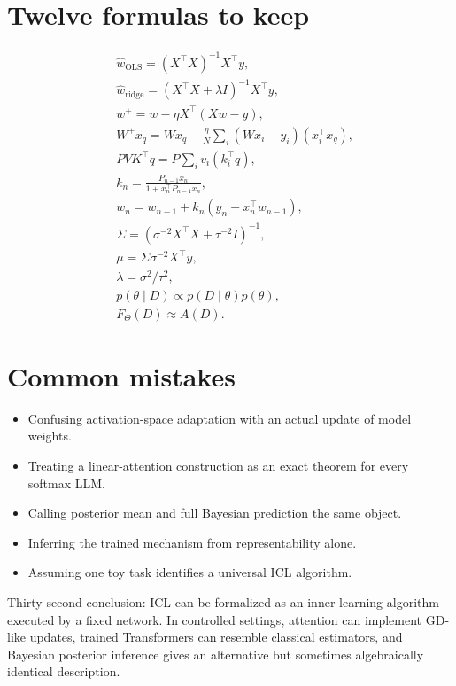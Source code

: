 \documentclass[11pt,a4paper,oneside,openany]{memoir}
\theoremstyle{definition}
\begin{document}
\section{Twelve formulas to keep}
\begin{align*}
&\hat w_{\mathrm{OLS}}=(X^\top X)^{-1}X^\top y,\\
&\hat w_{\mathrm{ridge}}=(X^\top X+\lambda I)^{-1}X^\top y,\\
&w^+=w-\eta X^\top(Xw-y),\\
&W^+x_q=Wx_q-\frac\eta N\sum_i(Wx_i-y_i)(x_i^\top x_q),\\
&PVK^\top q=P\sum_i v_i(k_i^\top q),\\
&k_n=\frac{P_{n-1}x_n}{1+x_n^\top P_{n-1}x_n},\\
&w_n=w_{n-1}+k_n(y_n-x_n^\top w_{n-1}),\\
&\Sigma=(\sigma^{-2}X^\top X+\tau^{-2}I)^{-1},\\
&\mu=\Sigma\sigma^{-2}X^\top y,\\
&\lambda=\sigma^2/\tau^2,\\
&p(\theta\mid D)\propto p(D\mid\theta)p(\theta),\\
&F_\Theta(D)\approx A(D).
\end{align*}

\section{Common mistakes}
\begin{itemize}
\item Confusing activation-space adaptation with an actual update of model weights.
\item Treating a linear-attention construction as an exact theorem for every softmax LLM.
\item Calling posterior mean and full Bayesian prediction the same object.
\item Inferring the trained mechanism from representability alone.
\item Assuming one toy task identifies a universal ICL algorithm.
\end{itemize}

\begin{presentbox}
Thirty-second conclusion: ICL can be formalized as an inner learning algorithm executed by a fixed network.  In controlled settings, attention can implement GD-like updates, trained Transformers can resemble classical estimators, and Bayesian posterior inference gives an alternative but sometimes algebraically identical description.
\end{presentbox}
\end{document}
